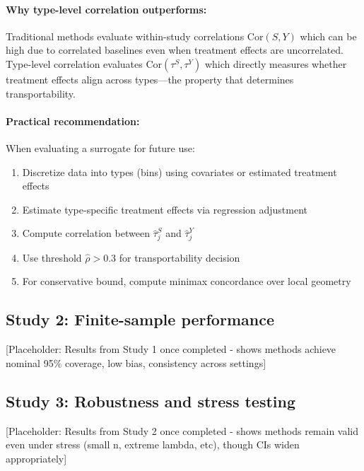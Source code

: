 \paragraph{Why type-level correlation outperforms:} Traditional methods evaluate within-study correlations $\text{Cor}(S, Y)$ which can be high due to correlated baselines even when treatment effects are uncorrelated. Type-level correlation evaluates $\text{Cor}(\tau^S, \tau^Y)$ which directly measures whether treatment effects align across types---the property that determines transportability.

\paragraph{Practical recommendation:} When evaluating a surrogate for future use:
\begin{enumerate}
    \item Discretize data into types (bins) using covariates or estimated treatment effects
    \item Estimate type-specific treatment effects via regression adjustment
    \item Compute correlation between $\hat{\tau}_j^S$ and $\hat{\tau}_j^Y$
    \item Use threshold $\hat{\rho} > 0.3$ for transportability decision
    \item For conservative bound, compute minimax concordance over local geometry
\end{enumerate}

\subsection{Study 2: Finite-sample performance}\label{sec:finite-sample}

[Placeholder: Results from Study 1 once completed - shows methods achieve nominal 95\% coverage, low bias, consistency across settings]

\subsection{Study 3: Robustness and stress testing}\label{sec:stress}

[Placeholder: Results from Study 2 once completed - shows methods remain valid even under stress (small n, extreme lambda, etc), though CIs widen appropriately]
